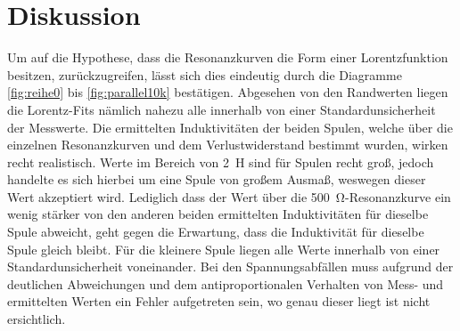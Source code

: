 \section{Diskussion}

	Um auf die Hypothese, dass die Resonanzkurven die Form einer Lorentzfunktion besitzen, zurückzugreifen, lässt sich dies eindeutig durch die Diagramme \ref{fig:reihe0} bis \ref{fig:parallel10k} bestätigen.
	Abgesehen von den Randwerten liegen die Lorentz-Fits nämlich nahezu alle innerhalb von einer Standardunsicherheit der Messwerte.
	Die ermittelten Induktivitäten der beiden Spulen, welche über die einzelnen Resonanzkurven und dem Verlustwiderstand bestimmt wurden, wirken recht realistisch.
	Werte im Bereich von \SI{2}{\henry} sind für Spulen recht groß, jedoch handelte es sich hierbei um eine Spule von großem Ausmaß, weswegen dieser Wert akzeptiert wird.
	Lediglich dass der Wert über die \SI{500}{\ohm}-Resonanzkurve ein wenig stärker von den anderen beiden ermittelten Induktivitäten für dieselbe Spule abweicht, geht gegen die Erwartung, dass die Induktivität für dieselbe Spule gleich bleibt.
	Für die kleinere Spule liegen alle Werte innerhalb von einer Standardunsicherheit voneinander.
	Bei den Spannungsabfällen muss aufgrund der deutlichen Abweichungen und dem antiproportionalen Verhalten von Mess- und ermittelten Werten ein Fehler aufgetreten sein, wo genau dieser liegt ist nicht ersichtlich. 